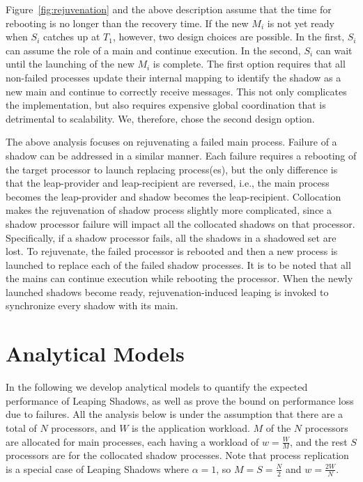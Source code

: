 Figure~\ref{fig:rejuvenation} and the above description assume that the time for rebooting is no longer than the recovery time. If the new $M_i$ is not yet ready when $S_i$ catches up at $T_1$, however, two design choices are possible. In the first, $S_i$ can assume the role of a main and continue execution. In the second, $S_i$ can wait until the launching of the new $M_i$ is complete. The first option requires that all non-failed processes update their internal mapping to identify the shadow as a new main and continue to correctly receive messages. This not only complicates the implementation, but also requires expensive global coordination that is detrimental to scalability. We, therefore, chose the second design option.

The above analysis focuses on rejuvenating a failed main process. 
Failure of a shadow can be addressed in a similar manner. Each failure requires a rebooting of the target processor to launch replacing process(es), but the only difference is that the leap-provider and leap-recipient are reversed, i.e., the main process becomes the leap-provider and shadow becomes the leap-recipient. Collocation makes the rejuvenation of shadow process slightly more complicated, since a shadow processor failure will impact all the collocated shadows on that processor. Specifically, 
if a shadow processor fails, all the shadows in a shadowed set are lost. To rejuvenate, the failed processor is rebooted and then a new process is launched to replace each of the failed shadow processes. It is to be noted that all the mains can continue execution while rebooting the processor. When the newly launched shadows become ready, rejuvenation-induced leaping is invoked to synchronize every shadow with its main.




\section{Analytical Models}
\vskip -0.2in
In the following we develop analytical models to quantify the expected performance of Leaping Shadows, as well as prove the bound on performance loss due to failures. 
All the analysis below is under the assumption that there are a total of $N$ processors, and $W$ is the application workload.  
$M$ of the $N$ processors are allocated for main processes, each having a workload of $w=\frac{W}{M}$, and the rest $S$ processors are for the collocated shadow processes. %
Note that process replication is a special case of Leaping Shadows where $\alpha=1$, so 
$M=S=\frac{N}{2}$ and $w=\frac{2W}{N}$. 

